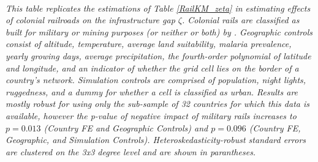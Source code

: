 \documentclass[11pt, oneside]{article}   	%
\begin{document}
\begin{table}[]
\justify
\textit{\\ \footnotesize This table replicates the estimations of Table \eqref{RailKM_zeta} in estimating effects of colonial railroads on the infrastructure gap $\zeta$. Colonial rails are classified as built for military or mining purposes (or neither or both) by \cite{jedwab_permanent_2016}. Geographic controls consist of altitude, temperature, average land suitability, malaria prevalence, yearly growing days, average precipitation, the fourth-order polynomial of latitude and longitude, and an indicator of whether the grid cell lies on the border of a country's network. Simulation controls are comprised of population, night lights, ruggedness, and a dummy for whether a cell is classified as urban. Results are mostly robust for using only the sub-sample of 32 countries for which this data is available, however the p-value of negative impact of military rails increases to $p=0.013$ (Country FE and Geographic Controls) and $p=0.096$ (Country FE, Geographic, and Simulation Controls). Heteroskedasticity-robust standard errors are clustered on the 3x3 degree level and are shown in parantheses.}
\end{table}




\newpage
\begin{spacing}{1.0}
\setlength{\bibsep}{2.5pt plus 1.5ex}

\end{spacing}
\end{document}
